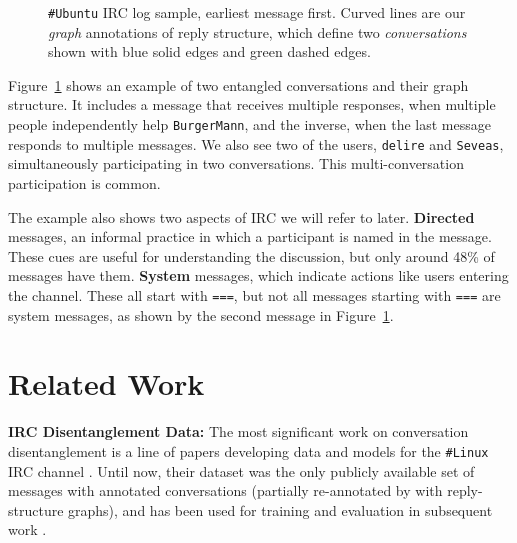 \documentclass[11pt,a4paper]{article}
\newcommand{\tightparagraph}[1]{\noindent\textbf{#1:}}
\begin{document}
\begin{figure}

  \caption{\label{fig:examples}
  \texttt{\#Ubuntu} IRC log sample, earliest message first.
  Curved lines are our \emph{graph} annotations of reply structure, which define two \emph{conversations} shown with blue solid edges and green dashed edges.
  }
\end{figure}
 
Figure~\ref{fig:examples} shows an example of two entangled conversations and their graph structure.
It includes a message that receives multiple responses, when multiple people independently help \texttt{BurgerMann}, and the inverse, when the last message responds to multiple messages.
We also see two of the users, \texttt{delire} and \texttt{Seveas}, simultaneously participating in two conversations.
This multi-conversation participation is common.

The example also shows two aspects of IRC we will refer to later.
\textbf{Directed} messages, an informal practice in which a participant is named in the message.
These cues are useful for understanding the discussion, but only around 48\% of messages have them.
\textbf{System} messages, which indicate actions like users entering the channel.
These all start with \texttt{===}, but not all messages starting with \texttt{===} are system messages, as shown by the second message in Figure~\ref{fig:examples}.

\section{Related Work}

\tightparagraph{IRC Disentanglement Data}
The most significant work on conversation disentanglement is a line of papers developing data and models for the \texttt{\#Linux} IRC channel \citep{elsner:2008,Elsner:WILP:2009,Elsner:2010,Elsner:ACL:2011}.
Until now, their dataset was the only publicly available set of messages with annotated conversations (partially re-annotated by \citet{Mehri:2017:IJCNLP} with reply-structure graphs), and has been used for training and evaluation in subsequent work \citep{Wang:2009,Mehri:2017:IJCNLP,Jiang:NAACL:2018}.
\end{document}
